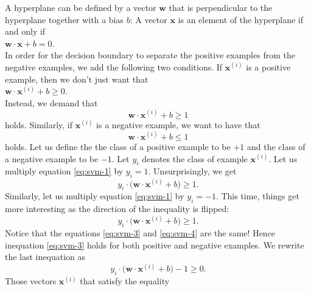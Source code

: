 A hyperplane can be defined by a vector $\mathbf{w}$ that is perpendicular to the hyperplane together with a
bias $b$:  A vector $\mathbf{x}$ is an element of the hyperplane if and only if
\\[0.2cm]
\hspace*{1.3cm}
$\mathbf{w} \cdot \mathbf{x} + b = 0$.
\\[0.2cm]
In order for the decision boundary to separate the positive examples from the negative examples, we add the
following two conditions.  If $\mathbf{x}^{(i)}$ is a positive example, then we don't just want that 
\\[0.2cm]
\hspace*{1.3cm}
$\mathbf{w} \cdot \mathbf{x}^{(i)} + b \geq 0$.
\\[0.2cm]
Instead, we demand that 
\begin{equation}
  \label{eq:svm-1}
  \mathbf{w} \cdot \mathbf{x}^{(i)} + b \geq 1
\end{equation}
holds.  Similarly, if $\mathbf{x}^{(i)}$ is a negative example, we want to have that
\begin{equation}
  \label{eq:svm-2}
    \mathbf{w} \cdot \mathbf{x}^{(i)} + b \leq 1
\end{equation}
holds.  Let us define the the class of a positive example to be $+1$ and the
class of a negative example to be $-1$.  Let $y_i$ denotes the class of example $\mathbf{x}^{(i)}$.
Let us multiply equation \ref{eq:svm-1} by $y_i = 1$.  Unsurprisingly, we get
\begin{equation}
  \label{eq:svm-3}
  y_i \cdot \bigl(\mathbf{w} \cdot \mathbf{x}^{(i)} + b) \geq 1.
\end{equation}
Similarly, let us multiply equation \ref{eq:svm-1} by $y_i = -1$.  This time, things get more interesting
as the direction of the inequality is flipped:
\begin{equation}
  \label{eq:svm-4}
    y_i \cdot \bigl(\mathbf{w} \cdot \mathbf{x}^{(i)} + b) \geq 1.
\end{equation}
Notice that the equations \ref{eq:svm-3} and \ref{eq:svm-4} are the same!  Hence
inequation \ref{eq:svm-3} holds for both positive and negative examples.  We rewrite the last inequation as
\begin{equation}
  \label{eq:svm-5}
    y_i \cdot \bigl(\mathbf{w} \cdot \mathbf{x}^{(i)} + b\bigr) - 1 \geq 0.
\end{equation}
Those vectors $\mathbf{x}^{(i)}$ that satisfy the equality
\\[0.2cm]
\hspace*{1.3cm}
